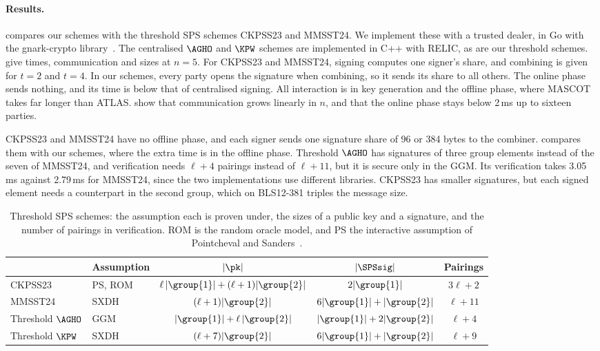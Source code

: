 \paragraph{Results.}  compares our schemes with the
threshold SPS schemes CKPSS23 and MMSST24. We implement these with a trusted
dealer, in Go with the gnark-crypto
library~\cite{AC:CKPSS23,PKC:MMSST24,gnark-crypto}. The centralised $\AGHO$ and
$\KPW$ schemes are implemented in C++ with RELIC, as are our threshold schemes.
 give times, communication and sizes at
$n = 5$. For CKPSS23 and MMSST24, signing computes one signer's share, and
combining is given for $t = 2$ and $t = 4$. In our schemes, every party opens
the signature when combining, so it sends its share to all others. The online phase sends nothing, and its time is below that of
centralised signing. All interaction is in key generation and the offline
phase, where MASCOT takes far longer than ATLAS.
 show that communication grows linearly
in $n$, and that the online phase stays below 2\,ms up to sixteen parties.

CKPSS23 and MMSST24 have no offline phase, and each signer sends one signature
share of 96 or 384 bytes to the combiner.  compares
them with our schemes, where the extra time is in the offline phase.
Threshold $\AGHO$ has signatures of three group elements instead of the seven of
MMSST24, and verification needs $\ell+4$ pairings instead of $\ell+11$, but it
is secure only in the GGM. Its verification takes 3.05\,ms against 2.79\,ms for
MMSST24, since the two implementations use different libraries. CKPSS23 has smaller signatures, but each signed element needs a counterpart
in the second group, which on BLS12-381 triples the message size.

\begin{table}[htbp] \centering \small \setlength{\tabcolsep}{3pt}
\begin{tabular}{l l c c c}
\toprule
 & Assumption & $|\pk|$ & $|\SPSsig|$ & Pairings \\
\midrule
CKPSS23~\cite{AC:CKPSS23} & PS, ROM & $\ell\,|\group{1}| + (\ell+1)|\group{2}|$ & $2|\group{1}|$ & $3\ell+2$ \\
MMSST24~\cite{PKC:MMSST24} & SXDH & $(\ell+1)|\group{2}|$ & $6|\group{1}| + |\group{2}|$ & $\ell+11$ \\
Threshold $\AGHO$ & GGM & $|\group{1}| + \ell\,|\group{2}|$ & $|\group{1}| + 2|\group{2}|$ & $\ell+4$ \\
Threshold $\KPW$ & SXDH & $(\ell+7)|\group{2}|$ & $6|\group{1}| + |\group{2}|$ & $\ell+9$ \\
\bottomrule
\end{tabular}
\caption[Comparison of threshold SPS schemes]{Threshold SPS schemes: the
assumption each is proven under, the sizes of a public key and a signature, and
the number of pairings in verification. ROM is the random oracle model, and PS
the interactive assumption of Pointcheval and Sanders~\cite{RSA:PoiSan16}.}
\label{tab:tsps-comp} \end{table}

